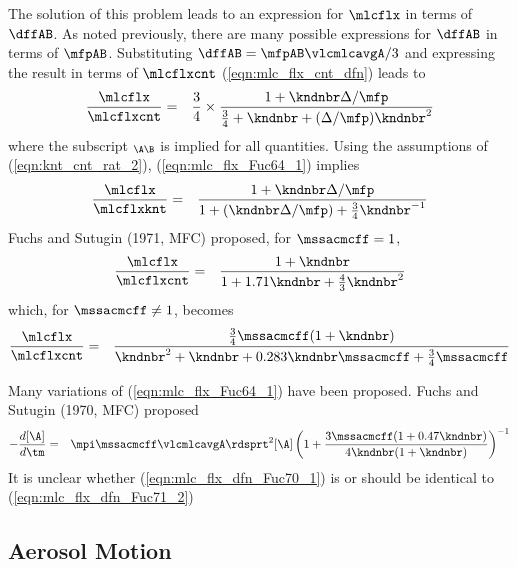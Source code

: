 \documentclass[12pt,twoside]{book}
\begin{document}
The solution of this problem leads to an expression for 
$\mlcflx$ in terms of $\dffAB$.
As noted previously, there are many possible expressions for $\dffAB$
in terms of $\mfpAB$.
Substituting $\dffAB = \mfpAB \vlcmlcavgA / 3$ and expressing the
result in terms of $\mlcflxcnt$ (\ref{eqn:mlc_flx_cnt_dfn}) leads to 
\begin{eqnarray}
\frac{\mlcflx}{\mlcflxcnt } & = & 
\frac{3}{4} \times \frac{1 + \kndnbr \Delta / \mfp}{
\frac{3}{4} + \kndnbr + ( \Delta / \mfp ) \kndnbr^{2} }
\label{eqn:mlc_flx_Fuc64_1}
\end{eqnarray}
where the subscript $_{\A \B}$ is implied for all quantities.
Using the assumptions of (\ref{eqn:knt_cnt_rat_2}),
(\ref{eqn:mlc_flx_Fuc64_1}) implies
\begin{eqnarray}
\frac{\mlcflx}{\mlcflxknt } & = & 
\frac{1 + \kndnbr \Delta / \mfp}{
1 + ( \kndnbr \Delta / \mfp ) + \frac{3}{4} \kndnbr^{-1} }
\label{eqn:mlc_flx_dfn_Fuc64_2}
\end{eqnarray}
Fuchs and Sutugin (1971, MFC) proposed, for $\mssacmcff = 1$, \cite[]{SeP97}
\begin{eqnarray}
\frac{\mlcflx}{\mlcflxcnt } & = & 
\frac{1 + \kndnbr}{1 + 1.71 \kndnbr + \frac{4}{3} \kndnbr^{2} }
\label{eqn:mlc_flx_dfn_Fuc71_1}
\end{eqnarray}
which, for $\mssacmcff \ne 1$, becomes
\begin{eqnarray}
\frac{\mlcflx}{\mlcflxcnt } & = & 
\frac{\frac{3}{4} \mssacmcff ( 1 + \kndnbr ) }{
\kndnbr^{2} + \kndnbr + 0.283 \kndnbr \mssacmcff + \frac{3}{4} \mssacmcff }
\label{eqn:mlc_flx_dfn_Fuc71_2}
\end{eqnarray}

Many variations of (\ref{eqn:mlc_flx_Fuc64_1}) have been proposed.
Fuchs and Sutugin (1970, MFC) proposed \cite[]{BOT99}
\begin{eqnarray}
- \frac{d [\A]}{d \tm } & = & 
\mpi \mssacmcff \vlcmlcavgA \rdsprt^{2} [\A]
\left( 1 + \frac{3 \mssacmcff ( 1 + 0.47 \kndnbr )}{
4 \kndnbr ( 1 + \kndnbr ) } \right)^{-1}
\label{eqn:mlc_flx_dfn_Fuc70_1}
\end{eqnarray}
It is unclear whether (\ref{eqn:mlc_flx_dfn_Fuc70_1}) is or should be
identical to (\ref{eqn:mlc_flx_dfn_Fuc71_2})

\subsection[Aerosol Motion]{Aerosol Motion}\label{sxn:mtn}
\end{document}
